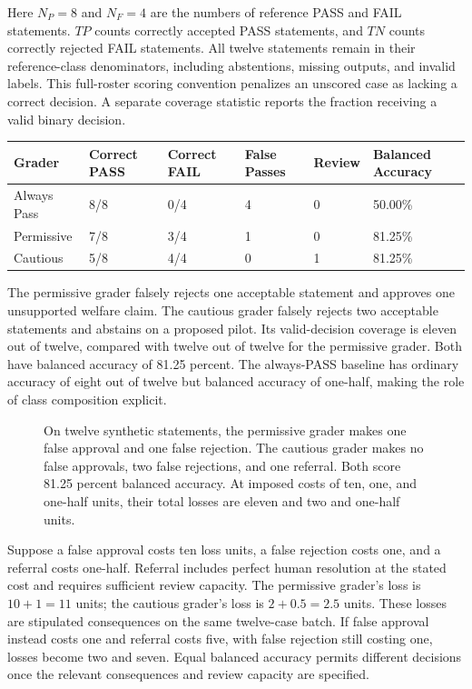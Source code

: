 Here \(N_P=8\) and \(N_F=4\) are the numbers of reference PASS and FAIL
statements. \(TP\) counts correctly accepted PASS statements, and \(TN\)
counts correctly rejected FAIL statements. All twelve statements remain
in their reference-class denominators, including abstentions, missing
outputs, and invalid labels. This full-roster scoring convention
penalizes an unscored case as lacking a correct decision. A separate
coverage statistic reports the fraction receiving a valid binary
decision.

\begin{table}[H]
\centering\small
\begin{tabular}{@{}llllll@{}}
\toprule
Grader & Correct PASS & Correct FAIL & False Passes & Review & Balanced
Accuracy \\
\midrule

Always Pass & 8/8 & 0/4 & 4 & 0 & 50.00\% \\
Permissive & 7/8 & 3/4 & 1 & 0 & 81.25\% \\
Cautious & 5/8 & 4/4 & 0 & 1 & 81.25\% \\
\bottomrule
\end{tabular}
\end{table}

The permissive grader falsely rejects one acceptable statement and
approves one unsupported welfare claim. The cautious grader falsely
rejects two acceptable statements and abstains on a proposed pilot. Its
valid-decision coverage is eleven out of twelve, compared with twelve
out of twelve for the permissive grader. Both have balanced accuracy of
81.25 percent. The always-PASS baseline has ordinary accuracy of eight
out of twelve but balanced accuracy of one-half, making the role of
class composition explicit.

\begin{figure}[htbp]
\centering

\caption{On twelve synthetic statements, the permissive grader makes one false approval and one false rejection. The cautious grader makes no false approvals, two false rejections, and one referral. Both score 81.25 percent balanced accuracy. At imposed costs of ten, one, and one-half units, their total losses are eleven and two and one-half units.}\label{fig:M05_grader_costs}
\end{figure}

Suppose a false approval costs ten loss units, a false rejection costs
one, and a referral costs one-half. Referral includes perfect human
resolution at the stated cost and requires sufficient review capacity.
The permissive grader's loss is \(10+1=11\) units; the cautious grader's
loss is \(2+0.5=2.5\) units. These losses are stipulated consequences on
the same twelve-case batch. If false approval instead costs one and
referral costs five, with false rejection still costing one, losses
become two and seven. Equal balanced accuracy permits different
decisions once the relevant consequences and review capacity are
specified.

